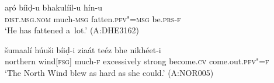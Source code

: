 \begin{exe}
\ex
\label{ex:10-76}
\gll aṛó bíiḍ-u bhakulíil-u hín-u \\
 \textsc{dist.msg.nom} much-\textsc{msg} fatten.\textsc{pfv"=msg} be.\textsc{prs-f} \\
\glt `He has fattened a~lot.' (A:DHE3162)

\ex
\label{ex:10-77}
\gll šumaalí húuši bíiḍ-i ziaát teéz bhe nikhéet-i\\
northern wind[\textsc{fsg}] much-\textsc{f} excessively strong become.\textsc{cv} come.out.\textsc{pfv"=f}\\
\glt `The North Wind blew as hard as she could.' (A:NOR005)
\end{exe}
